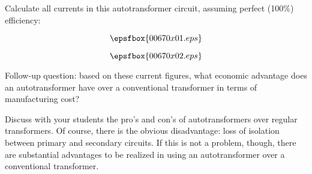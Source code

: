 

Calculate all currents in this autotransformer circuit, assuming perfect (100\%) efficiency:

$$\epsfbox{00670x01.eps}$$







$$\epsfbox{00670x02.eps}$$

\vskip 10pt

Follow-up question: based on these current figures, what economic advantage does an autotransformer have over a conventional transformer in terms of manufacturing cost?







Discuss with your students the pro's and con's of autotransformers over regular transformers.  Of course, there is the obvious disadvantage: loss of isolation between primary and secondary circuits.  If this is not a problem, though, there are substantial advantages to be realized in using an autotransformer over a conventional transformer.




